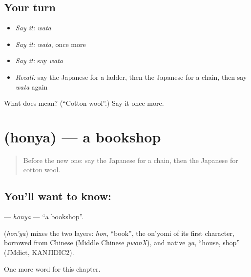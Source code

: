 \subsection*{Your turn}
\begin{itemize}
\raggedright
  \item \emph{Say it:} \emph{wata}
  \item \emph{Say it:} \emph{wata}, once more
  \item \emph{Say it:} say \emph{wata}
  \item \emph{Recall:} say the Japanese for a ladder, then the Japanese for a chain, then say \emph{wata} again
\end{itemize}

\begin{tcolorbox}[breakable,colback=teal!4,colframe=teal!35!black,title={Before you move on}]
What does  mean? (\textquotedblleft{}Cotton wool\textquotedblright{}.) Say it once more.
\end{tcolorbox}
\section[\texorpdfstring{\ja{ほんや} (honya)}{ほんや (honya)}]{ (honya) — a bookshop}

\label{lesson:JA-C118-honya}



\begin{quote}
Before the new one: say the Japanese for a chain, then the Japanese for cotton wool.
\end{quote}

\subsection*{You'll want to know: }
\textbf{} — \emph{honya} — \textquotedblleft{}a bookshop\textquotedblright{}.

\begin{cousinweb}
\textbf{} (\emph{hon'ya}) mixes the two layers: \emph{hon}, \textquotedblleft{}book\textquotedblright{}, the on'yomi of its first character, borrowed from Chinese (Middle Chinese \emph{pwonX}), and native \emph{ya}, \textquotedblleft{}house, shop\textquotedblright{} (JMdict, KANJIDIC2).
\end{cousinweb}

\begin{grammarlens}[title={What you've built}]
One more word for this chapter.
\end{grammarlens}

